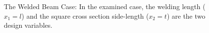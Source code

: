 \begin{figure}
\begin{minipage}[b]{1\linewidth}
 \centering
\end{minipage}
\caption{The Welded Beam Case: In the examined case, the welding length ($x_1\!=\!l$) and the square cross section side-length ($x_2\!=\!t$)  are the two design variables.} 
\label{case}
\end{figure}



